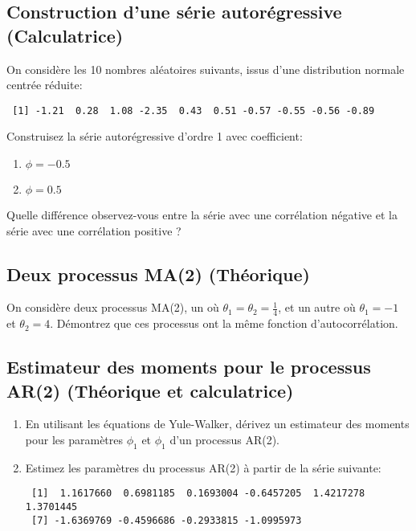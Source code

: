 \documentclass[11pt,english,francais]{article}
\begin{document}
\subsection{Construction d'une série autorégressive (Calculatrice)}
\label{sec:constr-dune-serie}

On considère les 10 nombres aléatoires suivants, issus d'une distribution normale centrée réduite:

\begin{verbatim}
 [1] -1.21  0.28  1.08 -2.35  0.43  0.51 -0.57 -0.55 -0.56 -0.89
\end{verbatim}

Construisez la série autorégressive d'ordre 1 avec coefficient: 
\begin{enumerate}
\item $\phi = -0.5$
\item $\phi = 0.5$
\end{enumerate}

Quelle différence observez-vous entre la série avec une corrélation négative et la série avec une corrélation positive ?

\subsection{Deux processus MA(2) (Théorique)}

On considère deux processus MA(2), un où $\theta_1 = \theta_2 = \frac{1}{4}$, et un autre où $\theta_1=-1$ et $\theta_2 = 4$. Démontrez que ces processus ont la même fonction d'autocorrélation.

\subsection{Estimateur des moments pour le processus AR(2) (Théorique et calculatrice)}

\begin{enumerate}
\item En utilisant les équations de Yule-Walker, dérivez un estimateur des moments pour les paramètres $\phi_1$ et $\phi_1$ d'un processus AR(2). \\

\item Estimez les paramètres du processus AR(2) à partir de la série suivante:
\begin{verbatim}
 [1]  1.1617660  0.6981185  0.1693004 -0.6457205  1.4217278  1.3701445
 [7] -1.6369769 -0.4596686 -0.2933815 -1.0995973
\end{verbatim}
\end{enumerate}
\end{document}
